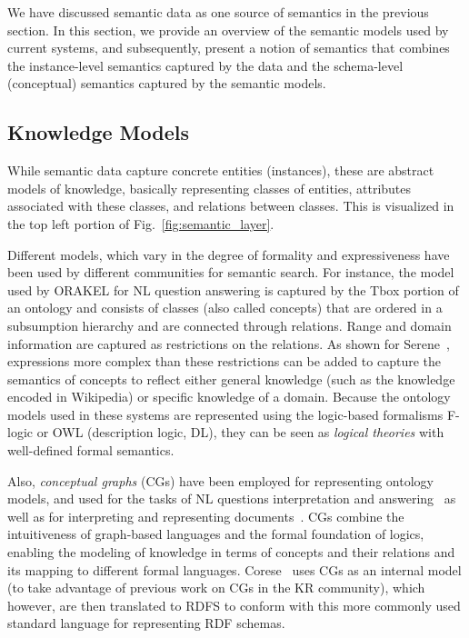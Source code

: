 We have discussed semantic data as one source of semantics in the previous section. In this section, we provide an overview of the semantic models used by current systems, and subsequently, present a notion of semantics that combines the instance-level semantics captured by the data and the schema-level (conceptual) semantics captured by the semantic models. 

\subsection{Knowledge Models} While semantic data capture concrete entities (instances), these are abstract models of knowledge, basically representing classes of entities, attributes associated with these classes, and relations between classes. This is visualized in the top left portion of Fig.~\ref{fig:semantic_layer}.  

Different models, which vary in the degree of formality and expressiveness have been used by different communities for semantic search. For instance, the model used by ORAKEL for NL question answering is captured by the Tbox portion of an ontology and consists of classes (also called concepts) that are ordered in a subsumption hierarchy and are connected through relations. Range and domain information are captured as restrictions on the relations. As shown for Serene~\cite{DBLP:journals/ws/FazzingaGGL11}, expressions more complex than these restrictions can be added to capture the semantics of concepts to reflect either general knowledge (such as the knowledge encoded in Wikipedia)
or specific knowledge of a domain. Because the ontology models used in these systems are represented using the logic-based formalisms F-logic or OWL (description logic, DL), they can be seen as \emph{logical theories} with well-defined formal semantics. 

Also, \emph{conceptual graphs} (CGs) have been employed for representing ontology models, and used for the tasks of NL questions interpretation and answering~\cite{DBLP:conf/aswc/CaoCT08} as well as for interpreting and representing documents~\cite{DBLP:conf/iccs/ComparotHH07}. CGs combine the intuitiveness of graph-based languages and the formal foundation of logics, enabling the modeling of knowledge in terms of concepts and their relations and its mapping to different formal languages. Corese~\cite{DBLP:conf/ecai/CorbyDF04} uses CGs as an internal model (to take advantage of previous work on CGs in the KR community), which however, are then translated to RDFS to conform with this more commonly used standard language for representing RDF schemas. 

